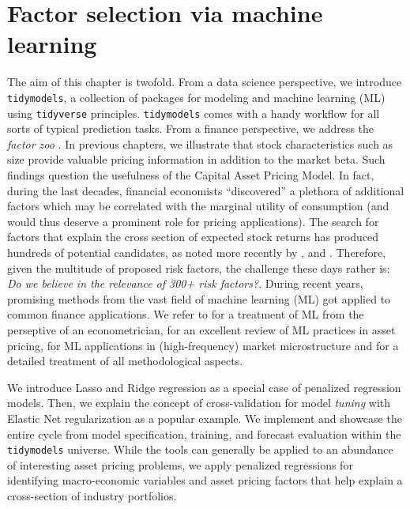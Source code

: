 \documentclass[
]{krantz}
\begin{document}
\hypertarget{factor-selection-via-machine-learning}{%
\chapter{Factor selection via machine learning}\label{factor-selection-via-machine-learning}}

The aim of this chapter is twofold. From a data science perspective, we introduce \texttt{tidymodels}, a collection of packages for modeling and machine learning (ML) using \texttt{tidyverse} principles. \texttt{tidymodels} comes with a handy workflow for all sorts of typical prediction tasks. From a finance perspective, we address the \emph{factor zoo} \citep{Cochrane2011}. In previous chapters, we illustrate that stock characteristics such as size provide valuable pricing information in addition to the market beta.
Such findings question the usefulness of the Capital Asset Pricing Model.
In fact, during the last decades, financial economists ``discovered'' a plethora of additional factors which may be correlated with the marginal utility of consumption (and would thus deserve a prominent role for pricing applications). The search for factors that explain the cross section of expected stock returns has produced hundreds of potential candidates, as noted more recently by \citet{Harvey2016}, \citet{McLean2016} and \citet{Hou2020}.
Therefore, given the multitude of proposed risk factors, the challenge these days rather is: \emph{Do we believe in the relevance of 300+ risk factors?}. During recent years, promising methods from the vast field of machine learning (ML) got applied to common finance applications. We refer to \citet{Mullainathan2017} for a treatment of ML from the perseptive of an econometrician, \citet{Nagel2021} for an excellent review of ML practices in asset pricing, \citet{Easley2021} for ML applications in (high-frequency) market microstructure and \citet{Dixon2020} for a detailed treatment of all methodological aspects.

We introduce Lasso and Ridge regression as a special case of penalized regression models. Then, we explain the concept of cross-validation for model \emph{tuning} with Elastic Net regularization as a popular example. We implement and showcase the entire cycle from model specification, training, and forecast evaluation within the \texttt{tidymodels} universe. While the tools can generally be applied to an abundance of interesting asset pricing problems, we apply penalized regressions for identifying macro-economic variables and asset pricing factors that help explain a cross-section of industry portfolios.
\end{document}
